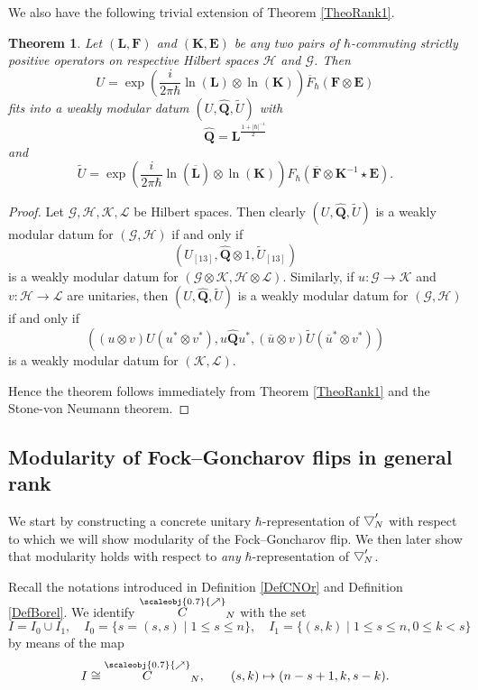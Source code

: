 \documentclass[11pt, reqno]{amsart}
\newtheorem{theorem}{Theorem}[section]
\theoremstyle{definition}
\numberwithin{equation}{section}
\def\Gc{\mathcal G}
\def\Hc{\mathcal H}
\newcommand{\Qb}{\mathbf{Q}}
\newcommand{\Kc}{\mathcal{K}}
\newcommand{\nears}{\scaleobj{0.7}{\nearrow}}
\newcommand{\neC}{\overset{\nears}{C}}
\newcommand{\Eb}{\mathbf{E}}
\newcommand{\Fb}{\mathbf{F}}
\newcommand{\Kb}{\mathbf{K}}
\newcommand{\Lb}{\mathbf{L}}
\newcommand{\wbtd}[1]{\raisebox{\depth}{$\bigtriangledown'$\!\!}_{#1}}
\begin{document}
We also have the following trivial extension of Theorem \ref{TheoRank1}. 

\begin{theorem}\label{TheoRank1Gen}
Let $(\Lb,\Fb)$ and $(\Kb,\Eb)$ be \emph{any} two pairs of $\hbar$-commuting strictly positive operators on respective Hilbert spaces $\Hc$ and $\Gc$. Then 
\[
U = \exp\left(\frac{i}{2\pi \hbar}\ln(\Lb) \otimes \ln(\Kb)\right) \overline{F}_{\hbar}(\Fb\otimes \Eb)
\]
fits into a weakly modular datum $(U,\hat{\Qb},\widetilde{U})$ with
\[
\hat{\Qb} = \Lb^{\frac{1+|\hbar|^{-1}}{2}}
\]
and 
\[
\widetilde{U} = \exp\left(\frac{i}{2\pi \hbar} \ln(\overline{\Lb}) \otimes \ln(\Kb)\right) F_{\hbar}(\overline{\Fb} \otimes \Kb^{-1}\star\Eb).
\]
\end{theorem}
\begin{proof}
Let $\Gc,\Hc,\Kc,\mathcal{L}$ be Hilbert spaces. Then clearly $(U,\hat{\Qb},\widetilde{U})$ is a weakly modular datum for $(\Gc,\Hc)$ if and only if 
\[
(U_{[13]},\hat{\Qb}\otimes 1,\widetilde{U}_{[13]})
\]
is a weakly modular datum for $(\Gc\otimes \Kc,\Hc\otimes \mathcal{L})$. Similarly, if $u\colon \Gc\rightarrow \Kc$ and $v\colon \Hc\rightarrow \mathcal{L}$ are unitaries, then $(U,\hat{\Qb},\widetilde{U})$ is a weakly modular datum for $(\Gc,\Hc)$ if and only if 
\[
((u\otimes v)U(u^*\otimes v^*),u\hat{\Qb}u^*,(\overline{u}\otimes v)\widetilde{U}(\overline{u}^*\otimes v^*))
\]
is a weakly modular datum for $(\Kc,\mathcal{L})$. 

Hence the theorem follows immediately from Theorem \ref{TheoRank1} and the Stone-von Neumann theorem.
\end{proof}

\subsection{Modularity of Fock--Goncharov flips in general rank}\label{SecModularity}

We start by constructing a concrete unitary $\hbar$-representation of $\wbtd{N}$ with respect to which we will show modularity of the Fock--Goncharov flip. We then later show that modularity holds with respect to \emph{any} $\hbar$-representation of $\wbtd{N}$.  

Recall the notations introduced in Definition \ref{DefCNOr} and Definition \ref{DefBorel}.  We identify $\neC_N$ with the set
\[
I = I_0 \cup I_1,\quad 
I_0 = \{s = (s,s)\mid 1\leq s\leq n\},\quad I_1 = \{(s,k)\mid 1\leq s\leq n, 0\leq k < s\}
\]
by means of the map 
\[
I \cong \neC_N,\qquad (s,k) \mapsto (n-s+1,k,s-k).
\]
\end{document}
